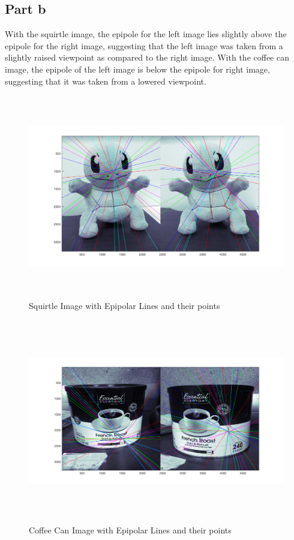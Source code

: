\documentclass[11pt,psfig]{article}
\begin{document}
\newpage

\subsection*{Part b}

With the squirtle image, the epipole for the left image lies slightly above the epipole for the right image, suggesting that the left image was taken from a slightly raised viewpoint as compared to the right image. With the coffee can image, the epipole of the left image is below the epipole for right image, suggesting that it was taken from a lowered viewpoint. 

\begin{figure}[H]
\centering
\includegraphics[height=3.5in]{squirtle_prob2Epipolar.png}
\caption{Squirtle Image with Epipolar Lines and their points}
\label{p2g}
\end{figure}

\begin{figure}[H]
\centering
\includegraphics[height=3.5in]{coffeeCan_prob2Epipolar.png}
\caption{Coffee Can Image with Epipolar Lines and their points}
\label{p2h}
\end{figure}
\end{document}
